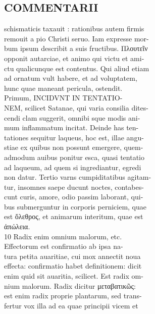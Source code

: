 \documentclass{article}
\begin{document}
\begin{pages}
\section*{COMMENTARII \\
                }schismaticis taxauit : rationibus autem firmis \\
                remouit a pio Christi seruo. Iam expresse mor- \\
                bum ipsum describit a suis fructibus. Πλουτεῖν \\
                opponit autarciae, et animo qui victu et ami- \\
                ctu qualicunque est contentus. Qui aliud etiam \\
                ad ornatum vult habere, et ad voluptatem, \\
                hunc quae maneant pericula, ostendit. \\
                Primum, INCIDVNT IN TENTATIO- \\
                NEM, scilicet Satanae, qui varia consilia dites- \\
                cendi clam suggerit, omnibi sque modis ani- \\
                mum inflammatum incitat. Deinde has ten- \\
                tationes sequitur laqueus, hoc est, illae angu- \\
                stiae ex quibus non possunt emergere, quem- \\
                admodum auibus ponitur esca, quasi tentatio \\
                ad laqueum, ad quem si ingrediantur, egredi \\
                non datur. Tertio varns cumpiditatibus agitam- \\
                tur, insomnes saepe ducunt noctes, contabes- \\
                cunt curis, amore, odio passim laborant, qui- \\
                bus submerguntur in corporis perniciem, quae \\
                est ὄλεθρος, et animarum interitum, quae est \\
                ἀπώλεια. \\
                10 Radix enim omnium malorum, etc. \\
                Effectorum est confirmatio ab ipsa na- \\
                tura petita auaritiae, cui mox annectit noua \\
                effecta: confirmatio habet definitionem: dicit \\
                enim quid sit auaritia, scilicet. Est radix om- \\
                nium malorum. Radix dicitur μεταβατικῶς: \\
                est enim radix proprie plantarum, sed trans- \\
                fertur vox illa ad ea quae principii vicem et \\
                

\end{pages}
\end{document}
